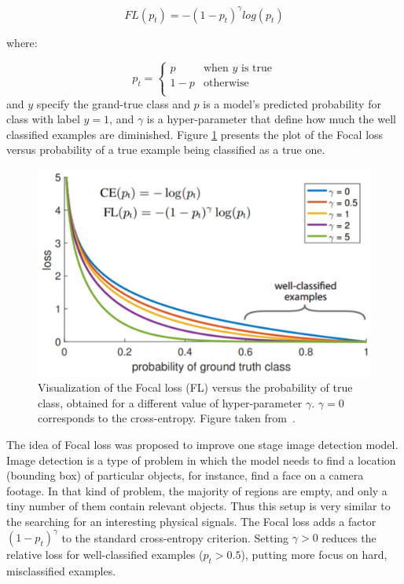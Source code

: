 \begin{equation}
FL(p_t) = -(1-p_t)^{\gamma}log(p_t)
\end{equation}

where:

\begin{equation}
    p_t = \left\{ \begin{array}{ll}
p & \textrm{when $y$ is true}\\
1-p & \textrm{otherwise}\\
\end{array} \right.
\end{equation}
and $y$ specify the grand-true class and $p$ is a model's predicted probability for class with label $y=1$, and $\gamma$ is a hyper-parameter that define how much the well classified examples are diminished.  Figure \ref{fig:Focal loss} presents the plot of the Focal loss versus probability of a true example being classified as a true one.

 \begin{figure}[!h]
\centering
\includegraphics[scale=0.5]{figures/Focal_loss.png}
\caption{Visualization of the Focal loss (FL) versus the probability of true class, obtained for a different value of hyper-parameter $\gamma$. $\gamma=0$ corresponds to the cross-entropy. Figure taken from~\cite{focal_loss}. 
\label{fig:Focal loss}}
\end{figure}


The idea of Focal loss was proposed to improve one stage image detection model. Image detection is a type of problem in which the model needs to find a location (bounding box) of particular objects, for instance, find a face on a camera footage. In that kind of problem, the majority of regions are empty, and only a tiny number of them contain relevant objects. Thus this setup is very similar to the searching for an interesting physical signals. The Focal loss adds a factor $(1 - p_t)^\gamma$ to the standard cross-entropy criterion. Setting $\gamma > 0$ reduces the relative loss for well-classified examples ($p_t > 0.5$), putting more focus on hard, misclassified examples.
 
